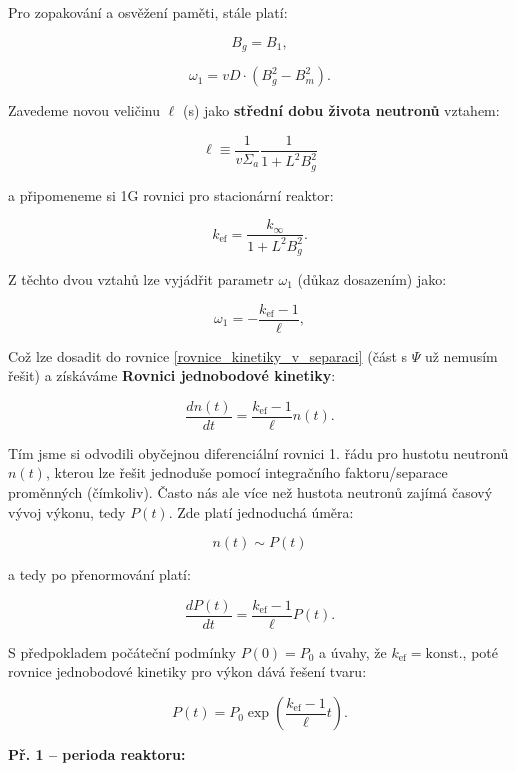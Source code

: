 Pro zopakování a osvěžení paměti, stále platí:

$$ B_g = B_1, $$

$$ \omega_1 = vD \cdot (B_g^2 - B_m^2). $$

Zavedeme novou veličinu $\ell$ (s) jako \textbf{střední dobu života neutronů} vztahem:

\begin{equation}
  \boxed{
  \ell \equiv \dfrac{1}{v \Sigma_a} \dfrac{1}{1+L^2B_g^2}
  \label{stredni_doba_zivota}}
\end{equation}

a připomeneme si 1G rovnici pro stacionární reaktor:

$$ k_{\text{ef}} = \dfrac{k_{\infty}}{1 + L^2 B_g^2}. $$

Z těchto dvou vztahů lze vyjádřit parametr $\omega_1$ (důkaz dosazením) jako:

$$ \omega_1 = -\dfrac{k_{\text{ef}} - 1}{\ell}, $$

Což lze dosadit do rovnice \eqref{rovnice_kinetiky_v_separaci} (část s $\Psi$ už nemusím řešit) a získáváme \textbf{Rovnici jednobodové kinetiky}:

\begin{equation}
  \boxed{
  \dfrac{dn(t)}{dt} = \dfrac{k_{\text{ef}} - 1}{\ell} n(t).
  \label{rovnice_kinetiky_reseni}}
\end{equation}

Tím jsme si odvodili obyčejnou diferenciální rovnici 1. řádu pro hustotu neutronů $n(t)$, kterou lze řešit jednoduše pomocí integračního faktoru/separace proměnných (čímkoliv). Často nás ale více než hustota neutronů zajímá časový vývoj výkonu, tedy $P(t)$. Zde platí jednoduchá úměra:

$$ n(t) \sim P(t) $$

a tedy po přenormování platí:

$$ \dfrac{dP(t)}{dt} = \dfrac{k_{\text{ef}} - 1}{\ell} P(t). $$

S předpokladem počáteční podmínky $P(0) = P_0$ a úvahy, že $k_{\text{ef}} = \text{konst.}$, poté rovnice jednobodové kinetiky pro výkon dává řešení tvaru:

\begin{equation}
  P(t) = P_0 \exp \left ( \dfrac{k_{\text{ef}} - 1}{\ell} t \right ).
  \label{rovnice_kinetiky_vykon}
\end{equation}

\small

\textbf{Př. 1 -- perioda reaktoru:}

